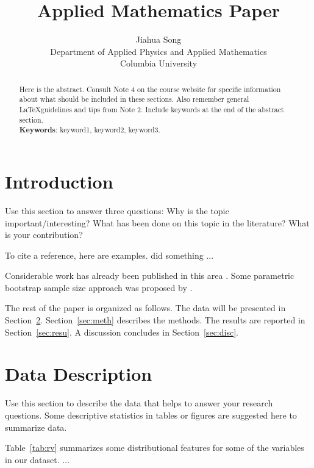 \documentclass[12pt]{article}
\title{Applied Mathematics Paper}
\author{Jiahua Song\\
  Department of Applied Physics and Applied Mathematics\\
  Columbia University
}
\begin{document}
\maketitle

\begin{abstract}
Here is the abstract.  Consult Note 4 on the course website for specific 
information about what should be included in these sections.  Also remember 
general \LaTeX guidelines and tips from Note 2. 
Include keywords at the end of the abstract section.\\

\noindent\textbf{Keywords}: keyword1, keyword2, keyword3.
\end{abstract}


\section{Introduction}
\label{sec:intro}

Use this section to answer three questions:
Why is the topic important/interesting?
What has been done on this topic in the literature?
What is your contribution?


To cite a reference, here are examples.
\citet{xie2015dynamic} did something ... 

Considerable work has already been published in this area 
\citep[e.g.,][]{xie2015dynamic}. Some parametric bootstrap sample size 
approach was proposed by \citet{dwivedi2017analysis}. 


The rest of the paper is organized as follows. The data will be presented in 
Section~\ref{sec:data}. Section~\ref{sec:meth} describes the methods. The 
results are reported in Section~\ref{sec:resu}. A discussion concludes in 
Section~\ref{sec:disc}.


\section{Data Description}
\label{sec:data}

Use this section to describe the data that helps to answer your research
questions. Some descriptive statistics in tables or figures are suggested 
here to summarize data.

Table~\ref{tab:rv} summarizes some distributional features for some of the 
variables in our dataset. $\ldots$
\end{document}
